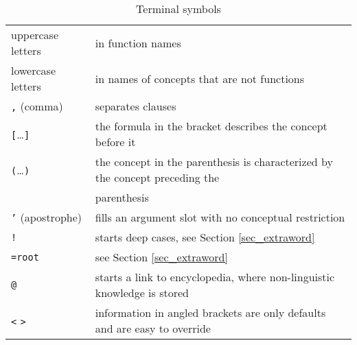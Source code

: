 \documentclass[a4paper,10pt]{article}
\begin{document}
\begin{table}[h]
\begin{center}
\begin{tabular}{ll}
 uppercase letters & in function names
\\ lowercase letters & in names of concepts that are not functions
\\ \texttt{,} (comma) & separates clauses
\\ \texttt{[}\ldots \texttt{]} & the formula in the bracket describes the concept before it
\\ \texttt{(}\ldots \texttt{)} & the concept in the parenthesis is characterized by the concept preceding the \\ & parenthesis
\\ \texttt{'} (apostrophe) & fills an argument slot with no conceptual restriction
\\ \texttt{!} & starts deep cases, see Section \ref{sec_extraword}
\\ \texttt{=root} & see Section \ref{sec_extraword}
\\ \texttt{@} & starts a link to encyclopedia, where non-linguistic knowledge is stored
\\ \texttt{<} \texttt{>}& information in angled brackets are only defaults and are easy to override
\end{tabular}
\end{center}
\caption{Terminal symbols}
\label{table_termin}
\end{table}
\end{document}
